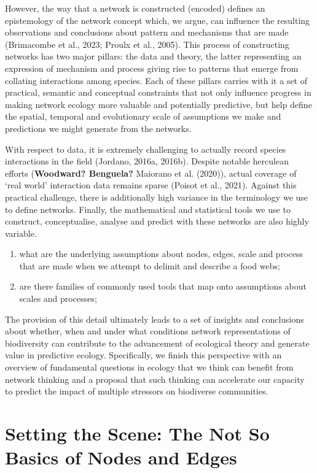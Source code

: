 \documentclass[
]{article}
\providecommand{\tightlist}{%
  \setlength{\itemsep}{0pt}\setlength{\parskip}{0pt}}\usepackage{longtable,booktabs,array}
\begin{document}
However, the way that a network is constructed (encoded) defines an
epistemology of the network concept which, we argue, can influence the
resulting observations and conclusions about pattern and mechanisms that
are made (Brimacombe et al., 2023; Proulx et al., 2005). This process of
constructing networks has two major pillars: the data and theory, the
latter representing an expression of mechanism and process giving rise
to patterns that emerge from collating interactions among species. Each
of these pillars carries with it a set of practical, semantic and
conceptual constraints that not only influence progress in making
network ecology more valuable and potentially predictive, but help
define the spatial, temporal and evolutionary scale of assumptions we
make and predictions we might generate from the networks.

With respect to data, it is extremely challenging to actually record
species interactions in the field (Jordano, 2016a, 2016b). Despite
notable herculean efforts (\textbf{Woodward? Benguela?} Maiorano et al.
(2020)), actual coverage of `real world' interaction data remains sparse
(Poisot et al., 2021). Against this practical challenge, there is
additionally high variance in the terminology we use to define networks.
Finally, the mathematical and statistical tools we use to construct,
conceptualise, analyse and predict with these networks are also highly
variable.

\begin{enumerate}
\def\labelenumi{\arabic{enumi}.}
\tightlist
\item
  what are the underlying assumptions about nodes, edges, scale and
  process that are made when we attempt to delimit and describe a food
  webs;
\item
  are there families of commonly used tools that map onto assumptions
  about scales and processes;
\end{enumerate}

The provision of this detail ultimately leads to a set of insights and
conclusions about whether, when and under what conditions network
representations of biodiversity can contribute to the advancement of
ecological theory and generate value in predictive ecology.
Specifically, we finish this perspective with an overview of fundamental
questions in ecology that we think can benefit from network thinking and
a proposal that such thinking can accelerate our capacity to predict the
impact of multiple stressors on biodiverse communities.

\section{Setting the Scene: The Not So Basics of Nodes and
Edges}\label{sec-anatomy}
\end{document}
